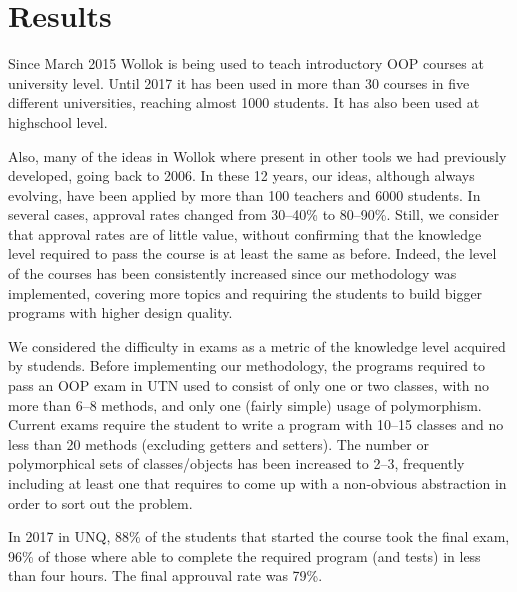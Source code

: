 \section{Results}
\label{sec:results}
Since March 2015 Wollok is being used to teach introductory OOP courses at university level.
Until 2017 it has been used in more than 30 courses in five different universities, reaching almost 1000 students.
It has also been used at highschool level.

Also, many of the ideas in Wollok where present in other tools we had previously developed, going back to 2006. 
In these 12 years, our ideas, although always evolving, have been applied by more than 100 teachers and 6000 students. 
In several cases, approval rates changed from 30--40\% to 80--90\%.
Still, we consider that approval rates are of little value,
without confirming that the knowledge level required to pass the course 
is at least the same as before.
Indeed, the level of the courses has been consistently increased since our methodology was implemented, 
covering more topics and requiring the students to build bigger programs with higher design quality.


We considered the difficulty in exams as a metric of the knowledge level acquired by studends.
Before implementing our methodology, the programs required to pass an OOP exam in UTN 
used to consist of only one or two classes, with no more than 6--8 methods, and only one (fairly simple) usage of polymorphism.
Current exams require the student to write a program with 10--15 classes and no less than 20 methods (excluding getters and setters).
The number or polymorphical sets of classes/objects has been increased to 2--3, 
frequently including at least one that requires to come up with a non-obvious abstraction in order to sort out the problem.

In 2017 in UNQ, 88\% of the students that started the course took the final exam,
96\% of those where able to complete the required program (and tests) in less than four hours.
The final approuval rate was 79\%.

